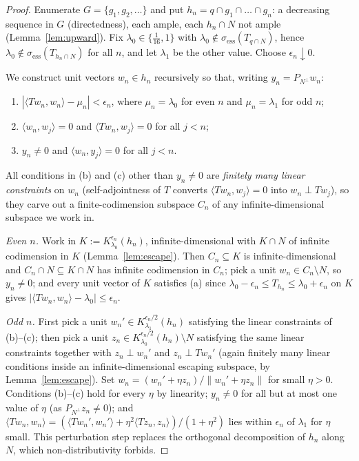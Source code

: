 \documentclass[11pt,reqno]{amsart}
\theoremstyle{definition}
\newcommand{\sess}{\sigma_{\mathrm{ess}}}
\begin{document}
\begin{proof}
Enumerate $G=\{g_1,g_2,\dots\}$ and put $h_n=q\cap g_1\cap\dots\cap g_n$: a decreasing
sequence in $G$ (directedness), each ample, each $h_n\cap N$ not ample
(Lemma~\ref{lem:upward}). Fix $\lambda_0\in\{\tfrac1{16},1\}$ with
$\lambda_0\notin\sess(T_{q\cap N})$, hence
$\lambda_0\notin\sess(T_{h_n\cap N})$ for all $n$, and let $\lambda_1$ be the other
value. Choose $\epsilon_n\downarrow0$.

We construct unit vectors $w_n\in h_n$ recursively so that, writing
$y_n=P_{N^\perp}w_n$:
\begin{enumerate}
\item[(a)] $|\langle Tw_n,w_n\rangle-\mu_n|<\epsilon_n$, where $\mu_n=\lambda_0$ for even
$n$ and $\mu_n=\lambda_1$ for odd $n$;
\item[(b)] $\langle w_n,w_j\rangle=0$ and $\langle Tw_n,w_j\rangle=0$ for all $j<n$;
\item[(c)] $y_n\neq0$ and $\langle w_n,y_j\rangle=0$ for all $j<n$.
\end{enumerate}
All conditions in (b) and (c) other than $y_n\neq0$ are \emph{finitely many linear
constraints} on $w_n$ (self-adjointness of $T$ converts $\langle Tw_n,w_j\rangle=0$ into
$w_n\perp Tw_j$), so they carve out a finite-codimension subspace $C_n$ of any
infinite-dimensional subspace we work in.

\emph{Even $n$.} Work in $K:=K^{\epsilon_n}_{\lambda_0}(h_n)$, infinite-dimensional with
$K\cap N$ of infinite codimension in $K$ (Lemma~\ref{lem:escape}). Then
$C_n\subseteq K$ is infinite-dimensional and $C_n\cap N\subseteq K\cap N$ has infinite
codimension in $C_n$; pick a unit $w_n\in C_n\setminus N$, so $y_n\neq0$; and every unit
vector of $K$ satisfies (a) since
$\lambda_0-\epsilon_n\le T_{h_n}\le\lambda_0+\epsilon_n$ on $K$ gives
$|\langle Tw_n,w_n\rangle-\lambda_0|\le\epsilon_n$.

\emph{Odd $n$.} First pick a unit $w_n'\in K^{\epsilon_n/2}_{\lambda_1}(h_n)$ satisfying
the linear constraints of (b)--(c); then pick a unit
$z_n\in K^{\epsilon_n/2}_{\lambda_0}(h_n)\setminus N$ satisfying the same linear
constraints together with $z_n\perp w_n'$ and $z_n\perp Tw_n'$ (again finitely many
linear conditions inside an infinite-dimensional escaping subspace, by
Lemma~\ref{lem:escape}). Set $w_n=(w_n'+\eta z_n)/\|w_n'+\eta z_n\|$ for small
$\eta>0$. Conditions (b)--(c) hold for every $\eta$ by linearity; $y_n\neq0$ for all but
at most one value of $\eta$ (as $P_{N^\perp}z_n\neq0$); and
$\langle Tw_n,w_n\rangle=(\langle Tw_n',w_n'\rangle+\eta^2\langle Tz_n,z_n\rangle)
/(1+\eta^2)$ lies within $\epsilon_n$ of $\lambda_1$ for $\eta$ small. This perturbation
step replaces the orthogonal decomposition of $h_n$ along $N$, which
non-distributivity forbids.


\end{proof}
\end{document}
